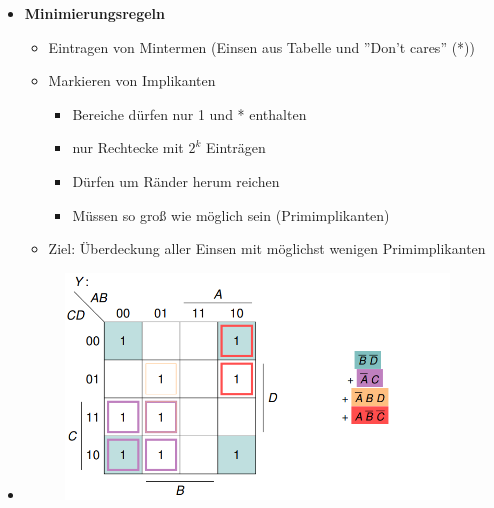 \documentclass[11pt,a4paper]{article}
\begin{document}
\begin{itemize}
\item \textbf{Minimierungsregeln}
	\begin{itemize}
	\item Eintragen von Mintermen (Einsen aus Tabelle und ''Don't cares'' (*))
	\item Markieren von Implikanten
		\begin{itemize}
		\item Bereiche dürfen nur 1 und * enthalten
		\item nur Rechtecke mit $2^k$ Einträgen
		\item Dürfen um Ränder herum reichen
		\item Müssen so groß wie möglich sein (Primimplikanten)
		\end{itemize}
	\item Ziel: Überdeckung aller Einsen mit möglichst wenigen Primimplikanten
	\end{itemize}
	\item[] \begin{figure}[H]
				\begin{center}
				\includegraphics[height=6cm]{karnaugh42}
				\end{center}
			\end{figure}
			


\end{itemize}

\pagebreak
\end{document}
